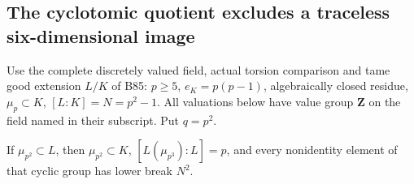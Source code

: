 \subsection{The cyclotomic quotient excludes a traceless six-dimensional image}

Use the complete discretely valued field, actual torsion
comparison and tame good extension \(L/K\) of B85:
\(p\ge5\), \(e_K=p(p-1)\), algebraically closed residue,
\(\mu_p\subset K\), \([L:K]=N=p^2-1\).
All valuations below have value group \(\mathbf Z\) on
the field named in their subscript. Put \(q=p^2\).

\begin{lemma}
\label{lem:B-RD86-cyclotomic}
If \(\mu_{p^2}\subset L\), then \(\mu_{p^2}\subset K\),
\([L(\mu_{p^3}):L]=p\), and every nonidentity element
of that cyclic group has lower break \(N^2\).
\end{lemma}
